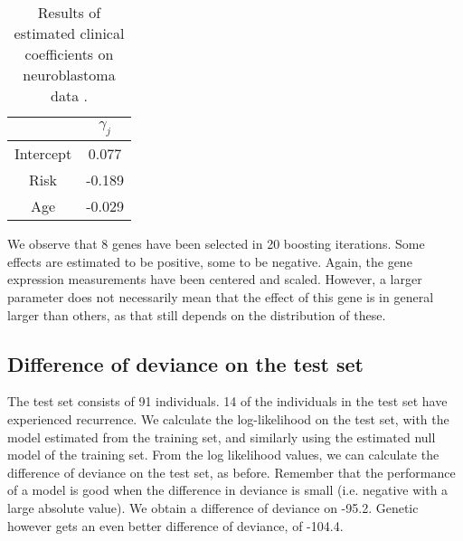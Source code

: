 \begin{table}
\caption{Results of estimated clinical coefficients on neuroblastoma data \citep{oberthuer-data}.}
\label{tab:oberthuer-gamma}
\centering
\begin{tabular}{cc}
\toprule
          & $\gamma_j$\\
\hline
Intercept &   0.077   \\
Risk      &  -0.189   \\
Age       &  -0.029   \\
\bottomrule
\end{tabular}
\end{table}

We observe that 8 genes have been selected in 20 boosting iterations.
Some effects are estimated to be positive, some to be negative.
Again, the gene expression measurements have been centered and scaled.
However, a larger parameter does not necessarily mean that the effect of this gene is in general larger than others, as that still depends on the distribution of these.



\subsection{Difference of deviance on the test set}
The test set consists of 91 individuals.
14 of the individuals in the test set have experienced recurrence.
We calculate the log-likelihood on the test set, with the model estimated from the training set, and similarly using the estimated null model of the training set.
From the log likelihood values, we can calculate the difference of deviance on the test set, as before.
Remember that the performance of a model is good when the difference in deviance is small (i.e. negative with a large absolute value).
We obtain a difference of deviance on -95.2.
Genetic however gets an even better difference of deviance, of -104.4.

